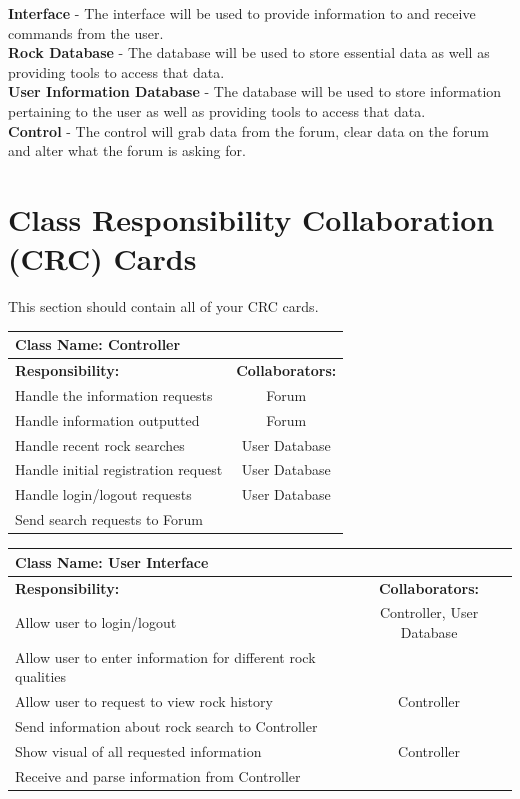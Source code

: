 \documentclass[titlepage]{article}
\begin{document}
\textbf{Interface} - The interface will be used to provide information to and receive commands from the user. \\

\textbf{Rock Database} - The database will be used to store essential data as well as providing tools to access that data.\\

\textbf{User Information Database} - The database will be used to store information pertaining to the user as well as providing tools to access that data.\\

\textbf{Control} - The control will grab data from the forum, clear data on the forum and alter what the forum is asking for.


\newpage
\section{Class Responsibility Collaboration (CRC) Cards}
This section should contain all of your CRC cards.

\begin{table}[!htb]
	\centering
	\begin{tabular}{| p{8cm} | c |} \hline
		\multicolumn{2}{|l|}{\textbf{Class Name: Controller}} \\ \hline
		\textbf{Responsibility:} & \textbf{Collaborators:} \\ \hline
		Handle the information requests & Forum\\ \hline
		Handle information outputted & Forum\\ \hline
		Handle recent rock searches & User Database\\ \hline
		Handle initial registration request & User Database\\ \hline
		Handle login/logout requests & User Database\\ \hline
		Send search requests to Forum & \\ \hline 		
	\end{tabular}
\end{table}

\begin{table}[!htb]
	\centering
	\begin{tabular}{| p{6.6cm} | c |} \hline 
		\multicolumn{2}{|l|}{\textbf{Class Name: User Interface}} \\ \hline
		\textbf{Responsibility:} & \textbf{Collaborators:} \\ \hline
		Allow user to login/logout & Controller, User Database\\ \hline
		Allow user to enter information for different rock qualities & \\ \hline
		Allow user to request to view rock history & Controller\\ \hline
		Send information about rock search to Controller & \\ \hline
		Show visual of all requested information & Controller\\ \hline
		Receive and parse information from Controller & \\ \hline
	\end{tabular}
\end{table}
\end{document}
